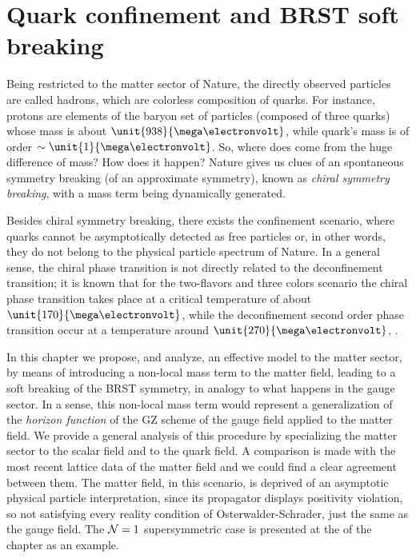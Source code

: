 

\chapter{Quark confinement and BRST soft breaking}
\label{brstonmatter}



Being restricted to the matter sector of Nature, the directly observed particles are called
hadrons, which are colorless composition of quarks. For instance, protons are elements of the
baryon set of particles (composed of three quarks) whose mass is about
$\unit{938}{\mega\electronvolt}$, while quark's mass is of order $\sim
\unit{1}{\mega\electronvolt}$. So, where does come from the huge difference of mass? How does
it happen? Nature gives us clues of an spontaneous symmetry breaking (of an approximate
symmetry), known as \emph{chiral symmetry breaking}, with a mass term being dynamically
generated.

Besides chiral symmetry breaking, there exists the confinement scenario, where quarks cannot 
be asymptotically detected as free particles or, in other words, they do not belong to the
physical particle spectrum of Nature. In a general sense, the chiral phase transition is not
directly related to the deconfinement transition; it is known that for the two-flavors and
three colors scenario the chiral phase transition takes place at a critical temperature of
about $\unit{170}{\mega\electronvolt}$, while the deconfinement second order phase transition
occur at a temperature around $\unit{270}{\mega\electronvolt}$,
\cite{Fukushima:2002bk,Fukushima:thesis,Fukushima:2010bq,Bazavov:2009zn,Fukushima:2003fw,Banks:1979yr}.

In this chapter we propose, and analyze, an effective model to the matter sector, by means of
introducing a non-local mass term to the matter field, leading to a soft breaking of the
BRST symmetry, in analogy to what happens in the gauge sector. In a sense, this non-local mass
term would represent a generalization of the \emph{horizon function} of the GZ scheme of the
gauge field applied to the matter field. We provide a general analysis of this procedure by
specializing the matter sector to the scalar field and to the quark field. A comparison is made
with the most recent lattice data of the matter field and we could find a clear agreement
between them. The matter field, in this scenario, is deprived of an asymptotic physical
particle interpretation, since its propagator displays positivity violation, so not satisfying
every reality condition of Osterwalder-Schrader, just the same as the gauge field. The ${\cal
N}=1$ supersymmetric case is presented at the of the chapter as an example.


